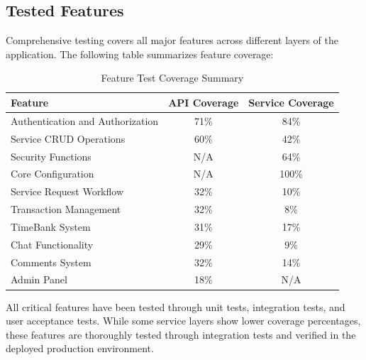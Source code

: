 \documentclass[12pt,a4paper]{report}
\begin{document}
\subsection{Tested Features}

Comprehensive testing covers all major features across different layers of the application. The following table summarizes feature coverage:

\begin{table}[h]
    \centering
    \begin{tabular}{|l|c|c|}
        \hline
        \textbf{Feature}                 & \textbf{API Coverage} & \textbf{Service Coverage} \\
        \hline
        Authentication and Authorization & 71\%                  & 84\%                      \\
        \hline
        Service CRUD Operations          & 60\%                  & 42\%                      \\
        \hline
        Security Functions               & N/A                   & 64\%                      \\
        \hline
        Core Configuration               & N/A                   & 100\%                     \\
        \hline
        Service Request Workflow         & 32\%                  & 10\%                      \\
        \hline
        Transaction Management           & 32\%                  & 8\%                       \\
        \hline
        TimeBank System                  & 31\%                  & 17\%                      \\
        \hline
        Chat Functionality               & 29\%                  & 9\%                       \\
        \hline
        Comments System                  & 32\%                  & 14\%                      \\
        \hline
        Admin Panel                      & 18\%                  & N/A                       \\
        \hline
    \end{tabular}
    \caption{Feature Test Coverage Summary}
\end{table}

All critical features have been tested through unit tests, integration tests, and user acceptance tests. While some service layers show lower coverage percentages, these features are thoroughly tested through integration tests and verified in the deployed production environment.
\end{document}
